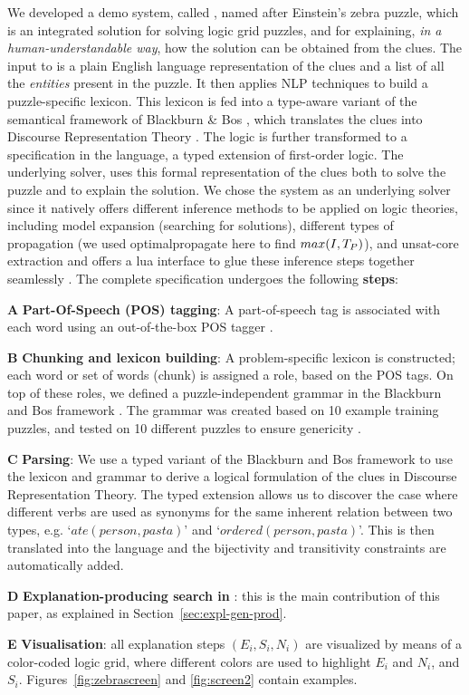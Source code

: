 We developed a demo system, called \ourtool, named after Einstein's zebra puzzle, which is an integrated solution for solving logic grid puzzles, and for explaining,  \textit{in a human-understandable way}, how the solution can be obtained from the clues. 
The input to \ourtool is a plain English language representation of the clues and a list of all the \textit{entities} present in the puzzle. It then applies NLP techniques to build a puzzle-specific lexicon. This lexicon is fed into a type-aware variant of the semantical framework of Blackburn \& Bos \cite{Blackburn2005,Blackburn2006}, which translates the clues into Discourse Representation Theory \cite{DRT}. The logic is further transformed to a specification in the \idp language, a typed extension of first-order logic. 
% 
The underlying solver, \idp\cite{IDP} uses this formal representation of the clues both to solve the puzzle and to explain the solution. 
We chose the \idp system as an underlying solver since it natively offers different inference methods to be applied on logic theories, including model expansion (searching for solutions), different types of propagation (we used optimalpropagate here to find $max(I,T_P)$), and unsat-core extraction and offers a lua interface to glue these inference steps together seamlessly \cite{IDP}. 
The complete specification undergoes the following \textbf{steps}:
\begin{compactenum}
	\item[\bf A] \textbf{Part-Of-Speech (POS) tagging}: A part-of-speech tag is associated with each word using an out-of-the-box POS tagger \cite{DBLP:journals/coling/MarcusSM94}.
	\item[\bf B] \textbf{Chunking and lexicon building}: A problem-specific lexicon is constructed; each word or set of words (chunk) is assigned a role, based on the POS tags. On top of these roles, we defined a puzzle-independent grammar in the Blackburn and Bos framework \cite{Blackburn2005,Blackburn2006}. The grammar was created based on 10 example training puzzles, and tested on 10 different puzzles to ensure genericity \cite{msc/Claes17}. 
	\item[\bf C] \textbf{Parsing}: We use a typed variant of the Blackburn and Bos framework to use the lexicon and grammar to derive a logical formulation of the clues in Discourse Representation Theory. The typed extension allows us to discover the case where different verbs are used as synonyms for the same inherent relation between two types, e.g. `$ate(person, pasta)$' and `$ordered(person, pasta)$'. This is then translated into the \idp language and the bijectivity and transitivity constraints are automatically added. 
	\item[\bf D] \textbf{Explanation-producing search in \idp}: this is the main contribution of this paper, as explained in Section~\ref{sec:expl-gen-prod}.
	\item[\bf E] \textbf{Visualisation}: all  explanation steps $(E_i, S_i, N_i)$ are visualized by means of a color-coded logic grid, where different colors are used to highlight $E_i$ and $N_i$, and $S_i$. Figures~\ref{fig:zebrascreen} and \ref{fig:screen2} contain examples.
\end{compactenum}

